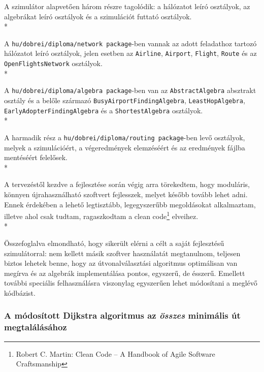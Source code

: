   A szimulátor alapvetően három részre tagolódik: a hálózatot leíró osztályok, az algebrákat leíró osztályok és a szimulációt futtató osztályok.\\*

  A \texttt{hu/dobrei/diploma/network package}-ben vannak az adott feladathoz tartozó hálózatot leíró osztályok, jelen esetben az \texttt{Airline}, \texttt{Airport}, \texttt{Flight}, \texttt{Route} és az \texttt{OpenFlightsNetwork} osztályok.\\*

  A \texttt{hu/dobrei/diploma/algebra package}-ben van az \texttt{AbstractAlgebra} absztrakt osztály és a belőle származó \texttt{BusyAirportFindingAlgebra}, \texttt{LeastHopAlgebra}, \texttt{EarlyAdopterFindingAlgebra} és a \texttt{ShortestAlgebra} osztályok.\\*

  A harmadik rész a \texttt{hu/dobrei/diploma/routing package}-ben levő osztályok, melyek a szimulációért, a végeredmények elemzéséért és az eredmények fájlba mentéséért felelősek.\\*

  A tervezéstől kezdve a fejlesztése során végig arra törekedtem, hogy moduláris, könnyen újrahasználható szoftvert fejlesszek, melyet később tovább lehet adni. Ennek érdekében a lehető legtisztább, legegyszerűbb megoldásokat alkalmaztam, illetve ahol csak tudtam, ragaszkodtam a clean code\footnote{Robert C. Martin: Clean Code -- A Handbook of Agile Software Craftsmanship} elveihez.\\*

  Összefoglalva elmondható, hogy sikerült elérni a célt a saját fejlesztésű szimulátorral: nem kellett másik szoftver használatát megtanulnom, teljesen biztos lehetek benne, hogy az útvonalválasztási algoritmus optimálisan van megírva és az algebrák implementálása pontos, egyszerű, de ésszerű. Emellett további speciális felhasználásra viszonylag egyszerűen lehet módosítani a meglévő kódbázist.

    \subsubsection{A módosított Dijkstra algoritmus az \textit{összes} minimális út megtalálásához}\label{dijkstra}
